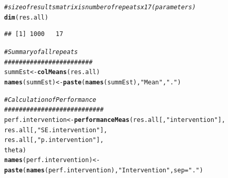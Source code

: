 \documentclass{article}\usepackage[]{graphicx}\usepackage[]{color}
\makeatletter
\newcommand{\hlstr}[1]{\textcolor[rgb]{0.192,0.494,0.8}{#1}}%
\newcommand{\hlcom}[1]{\textcolor[rgb]{0.678,0.584,0.686}{\textit{#1}}}%
\newcommand{\hlstd}[1]{\textcolor[rgb]{0.345,0.345,0.345}{#1}}%
\newcommand{\hlkwb}[1]{\textcolor[rgb]{0.69,0.353,0.396}{#1}}%
\newcommand{\hlkwc}[1]{\textcolor[rgb]{0.333,0.667,0.333}{#1}}%
\newcommand{\hlkwd}[1]{\textcolor[rgb]{0.737,0.353,0.396}{\textbf{#1}}}%
\newenvironment{kframe}{%
 \def\at@end@of@kframe{}%
 \ifinner\ifhmode%
  \def\at@end@of@kframe{\end{minipage}}%
  \begin{minipage}{\columnwidth}%
 \fi\fi%
 \def\FrameCommand##1{\hskip\@totalleftmargin \hskip-\fboxsep
 \colorbox{shadecolor}{##1}\hskip-\fboxsep
     \hskip-\linewidth \hskip-\@totalleftmargin \hskip\columnwidth}%
 \MakeFramed {\advance\hsize-\width
   \@totalleftmargin\z@ \linewidth\hsize
   \@setminipage}}%
 {\par\unskip\endMakeFramed%
 \at@end@of@kframe}
\newenvironment{knitrout}{}{} %
\makeatother
\begin{document}
\begin{knitrout}
\color{fgcolor}\begin{kframe}
\begin{alltt}
\hlcom{#size of results matrix is number of repeats x 17 (parameters)}
\hlkwd{dim}\hlstd{(res.all)}
\end{alltt}
\begin{verbatim}
## [1] 1000   17
\end{verbatim}
\begin{alltt}
\hlcom{#Summary of all repeats}
\hlcom{########################}
\hlstd{summEst}\hlkwb{<-}\hlkwd{colMeans}\hlstd{(res.all)}
\hlkwd{names}\hlstd{(summEst)}\hlkwb{<-}\hlkwd{paste}\hlstd{(}\hlkwd{names}\hlstd{(summEst),} \hlstr{"Mean"}\hlstd{,}\hlstr{"."}\hlstd{)}

\hlcom{#Calculation of Performance}
\hlcom{###########################}
\hlstd{perf.intervention}\hlkwb{<-}\hlkwd{performanceMeas}\hlstd{(res.all[,}\hlstr{"intervention"}\hlstd{],}
                                   \hlstd{res.all[,}\hlstr{"SE.intervention"}\hlstd{],}
                                   \hlstd{res.all[,}\hlstr{"p.intervention"}\hlstd{],}
                                   \hlstd{theta)}
\hlkwd{names}\hlstd{(perf.intervention)}\hlkwb{<-}\hlkwd{paste}\hlstd{(}\hlkwd{names}\hlstd{(perf.intervention),}\hlstr{"Intervention"}\hlstd{,}\hlkwc{sep}\hlstd{=}\hlstr{"."}\hlstd{)}


\end{alltt}
\end{kframe}
\end{knitrout}
\end{document}
